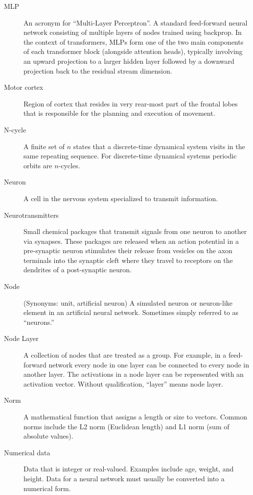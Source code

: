 \begin{description}
\item[MLP]  An acronym for “Multi-Layer Perceptron”. A standard feed-forward neural network consisting of multiple layers of nodes trained using backprop. In the context of transformers, MLPs form one of the two main components of each transformer block (alongside attention heads), typically involving an upward projection to a larger hidden layer followed by a downward projection back to the residual stream dimension.  


\item[Motor cortex] Region of cortex that resides in very rear-most part of the frontal lobes that is responsible for the planning and execution of movement. 

\item[N-cycle] A finite set of $n$ states that a discrete-time dynamical system visits in the same repeating sequence. For discrete-time dynamical systems periodic orbits are $n$-cycles.

\item[Neuron] A cell in the nervous system specialized to transmit information.

\item[Neurotransmitters] Small chemical packages that transmit signals from one neuron to another via synapses. These packages are released when an action potential in a pre-synaptic neuron stimulates their release from vesicles on the axon terminals into the synaptic cleft where they travel to receptors on the dendrites of a post-synaptic neuron. 

\item[Node] (Synonyms: unit, artificial neuron) A simulated neuron or neuron-like element in an artificial neural network.  Sometimes simply referred to as ``neurons.''

\item[Node Layer] A collection of nodes that are treated as a group. For example, in a feed-forward network every node in one layer can be connected to every node in another layer. The activations in a node layer can be represented with an activation vector. Without qualification, ``layer'' means node layer.

\item[Norm] A mathematical function that assigns a length or size to vectors. Common norms include the L2 norm (Euclidean length) and L1 norm (sum of absolute values). 

\item[Numerical data] Data that is integer or real-valued. Examples include age, weight, and height. Data for a neural network must usually be converted into a numerical form.


\end{description}
